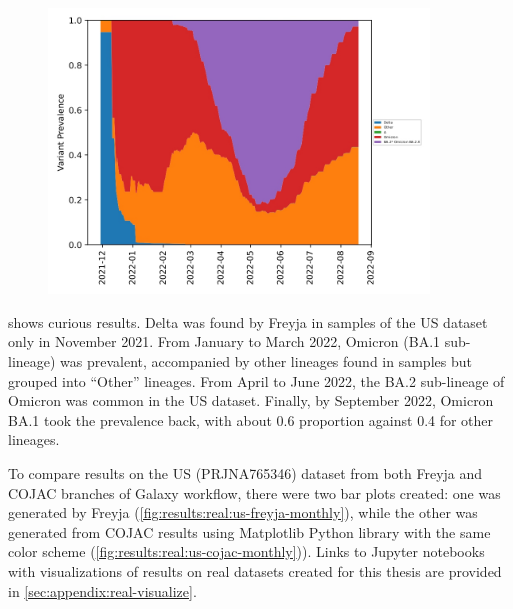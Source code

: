     \begin{figure}[ht!]
        \centering
        \includegraphics[width=0.9\textwidth]{figures/results/real/us-freyja-daily.jpg}
        \label{fig:results:real:us-freyja-daily}
    \end{figure}
    
     shows curious results. Delta was found by Freyja in samples of the US dataset only in November 2021. From January to March 2022, Omicron (BA.1 sub-lineage) was prevalent, accompanied by other lineages found in samples but grouped into “Other” lineages. From April to June 2022, the BA.2 sub-lineage of Omicron was common in the US dataset. Finally, by September 2022, Omicron BA.1 took the prevalence back, with about 0.6 proportion against 0.4 for other lineages.

    To compare results on the US (PRJNA765346) dataset from both Freyja and COJAC branches of Galaxy workflow, there were two bar plots created: one was generated by Freyja  (\cref{fig:results:real:us-freyja-monthly}), while the other was generated from COJAC results using Matplotlib Python library with the same color scheme (\cref{fig:results:real:us-cojac-monthly})). Links to Jupyter notebooks with visualizations of results on real datasets created for this thesis are provided in \cref{sec:appendix:real-visualize}.
    
